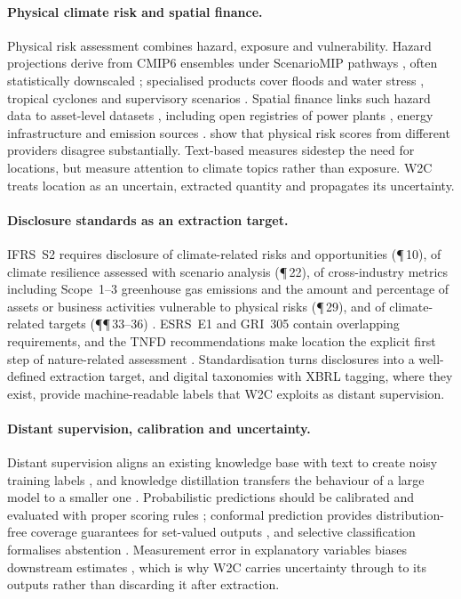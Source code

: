 \documentclass{article}
\theoremstyle{plain}
\theoremstyle{definition}
\begin{document}
\paragraph{Physical climate risk and spatial finance.} Physical risk assessment combines hazard, exposure and vulnerability. Hazard projections derive from CMIP6 ensembles \citep{eyring2016cmip6} under ScenarioMIP pathways \citep{oneill2016scenariomip}, often statistically downscaled \citep{thrasher2022nex}; specialised products cover floods and water stress \citep{ward2020aqueduct,kuzma2023aqueduct}, tropical cyclones \citep{knapp2010ibtracs} and supervisory scenarios \citep{ngfs2023}. Spatial finance links such hazard data to asset-level datasets \citep{caldecott2022spatial}, including open registries of power plants \citep{byers2018gppd}, energy infrastructure \citep{gem2024} and emission sources \citep{climatetrace2024}. \citet{hain2022physical} show that physical risk scores from different providers disagree substantially. Text-based measures \citep{sautner2023firm} sidestep the need for locations, but measure attention to climate topics rather than exposure. W2C treats location as an uncertain, extracted quantity and propagates its uncertainty.

\paragraph{Disclosure standards as an extraction target.} IFRS~S2 requires disclosure of climate-related risks and opportunities (\P\,10), of climate resilience assessed with scenario analysis (\P\,22), of cross-industry metrics including Scope~1--3 greenhouse gas emissions and the amount and percentage of assets or business activities vulnerable to physical risks (\P\,29), and of climate-related targets (\P\P\,33--36) \citep{ifrs2023s2}. ESRS~E1 \citep{ec2023esrs} and GRI~305 \citep{gri305} contain overlapping requirements, and the TNFD recommendations make location the explicit first step of nature-related assessment \citep{tnfd2023}. Standardisation turns disclosures into a well-defined extraction target, and digital taxonomies with XBRL tagging, where they exist, provide machine-readable labels that W2C exploits as distant supervision.

\paragraph{Distant supervision, calibration and uncertainty.} Distant supervision aligns an existing knowledge base with text to create noisy training labels \citep{mintz2009distant}, and knowledge distillation transfers the behaviour of a large model to a smaller one \citep{hinton2015distilling}. Probabilistic predictions should be calibrated \citep{guo2017calibration} and evaluated with proper scoring rules \citep{brier1950}; conformal prediction provides distribution-free coverage guarantees for set-valued outputs \citep{vovk2005algorithmic,angelopoulos2023gentle}, and selective classification formalises abstention \citep{geifman2017selective}. Measurement error in explanatory variables biases downstream estimates \citep{carroll2006measurement}, which is why W2C carries uncertainty through to its outputs rather than discarding it after extraction.
\end{document}
